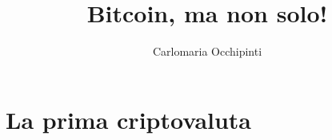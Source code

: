 \documentclass{article}
\title {Bitcoin, ma non solo!}
\author {Carlomaria Occhipinti}
\begin{document}
\maketitle
\tableofcontents
{}
\newpage
{}

\section{La prima criptovaluta}
\end{document}
